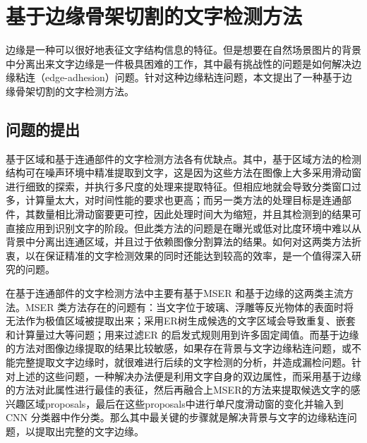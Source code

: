 ﻿%
%
%
%
%
%

\chapter{基于边缘骨架切割的文字检测方法}
\label{sec.c3}

    边缘是一种可以很好地表征文字结构信息的特征。但是想要在自然场景图片的背景中分离出来文字边缘是一件极具困难的工作，其中最有挑战性的问题是如何解决边缘粘连（edge-adhesion）问题。针对这种边缘粘连问题，本文提出了一种基于边缘骨架切割的文字检测方法。

    \section{问题的提出}

    基于区域和基于连通部件的文字检测方法各有优缺点。其中，基于区域方法的检测结构可在噪声环境中精准提取到文字，这是因为这些方法在图像上大多采用滑动窗进行细致的探索，并执行多尺度的处理来提取特征。但相应地就会导致分类窗口过多，计算量太大，对时间性能的要求也更高；而另一类方法的处理目标是连通部件，其数量相比滑动窗要更可控，因此处理时间大为缩短，并且其检测到的结果可直接应用到识别文字的阶段。但此类方法的问题是在曝光或低对比度环境中难以从背景中分离出连通区域，并且过于依赖图像分割算法的结果。如何对这两类方法折衷，以在保证精准的文字检测效果的同时还能达到较高的效率，是一个值得深入研究的问题。

    在基于连通部件的文字检测方法中主要有基于MSER 和基于边缘的这两类主流方法。MSER 类方法存在的问题有：当文字位于玻璃、浮雕等反光物体的表面时将无法作为极值区域被提取出来；采用ER树生成候选的文字区域会导致重复、嵌套和计算量过大等问题；用来过滤ER 的启发式规则用到许多固定阈值。而基于边缘的方法对图像边缘提取的结果比较敏感，如果存在背景与文字边缘粘连问题，或不能完整提取文字边缘时，就很难进行后续的文字检测的分析，并造成漏检问题。针对上述的这些问题，一种解决办法便是利用文字自身的双边属性，而采用基于边缘的方法对此属性进行最佳的表征，然后再融合上MSER的方法来提取候选文字的感兴趣区域proposals，最后在这些proposals中进行单尺度滑动窗的变化并输入到CNN 分类器中作分类。那么其中最关键的步骤就是解决背景与文字的边缘粘连问题，以提取出完整的文字边缘。

